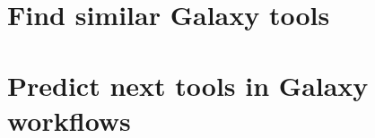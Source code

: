 \documentclass[11pt, a4paper, BCOR=10mm, english, ngerman, oneside]{scrbook}
\begin{document}
    \pagestyle{empty} %
    \hypersetup{pageanchor=false}
    
    
    
    \pagestyle{plain} %
    \frontmatter  %
    
    
    
    \tableofcontents
    \listoffigures
    \listoftables
    \hypersetup{pageanchor=true}  %

    \mainmatter  %
    \part{Find similar Galaxy tools}
    
    
    
    
    
    
    \part{Predict next tools in Galaxy workflows}
    
    
    
    
    
    
    
    
    \renewcommand{\bibname}{Bibliography}
    
    
    
    \newpage
    \thispagestyle{empty}
    \mbox{}
\end{document}
